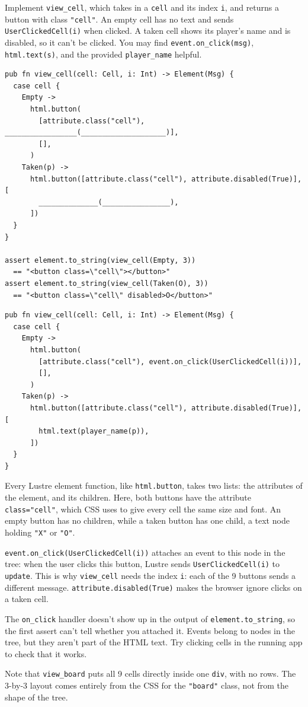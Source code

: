 \begin{blocksection}
\question Implement \texttt{view\_cell}, which takes in a \texttt{cell} and its index \texttt{i}, and returns a button with class \texttt{"cell"}. An empty cell has no text and sends \lstinline{UserClickedCell(i)} when clicked. A taken cell shows its player's name and is disabled, so it can't be clicked. You may find \lstinline{event.on_click(msg)}, \lstinline{html.text(s)}, and the provided \texttt{player\_name} helpful.
\begin{lstlisting}
pub fn view_cell(cell: Cell, i: Int) -> Element(Msg) {
  case cell {
    Empty ->
      html.button(
        [attribute.class("cell"), _________________(____________________)],
        [],
      )
    Taken(p) ->
      html.button([attribute.class("cell"), attribute.disabled(True)], [
        ______________(________________),
      ])
  }
}

assert element.to_string(view_cell(Empty, 3))
  == "<button class=\"cell\"></button>"
assert element.to_string(view_cell(Taken(O), 3))
  == "<button class=\"cell\" disabled>O</button>"
\end{lstlisting}

\begin{solution}
\begin{lstlisting}
pub fn view_cell(cell: Cell, i: Int) -> Element(Msg) {
  case cell {
    Empty ->
      html.button(
        [attribute.class("cell"), event.on_click(UserClickedCell(i))],
        [],
      )
    Taken(p) ->
      html.button([attribute.class("cell"), attribute.disabled(True)], [
        html.text(player_name(p)),
      ])
  }
}
\end{lstlisting}
\end{solution}

\begin{questionmeta}
  Every Lustre element function, like \lstinline{html.button}, takes two lists: the attributes of the element, and its children. Here, both buttons have the attribute \lstinline{class="cell"}, which CSS uses to give every cell the same size and font. An empty button has no children, while a taken button has one child, a text node holding \texttt{"X"} or \texttt{"O"}.

  \lstinline{event.on_click(UserClickedCell(i))} attaches an event to this node in the tree: when the user clicks this button, Lustre sends \lstinline{UserClickedCell(i)} to \texttt{update}. This is why \texttt{view\_cell} needs the index \texttt{i}: each of the 9 buttons sends a different message. \lstinline{attribute.disabled(True)} makes the browser ignore clicks on a taken cell.

  The \lstinline{on_click} handler doesn't show up in the output of \lstinline{element.to_string}, so the first assert can't tell whether you attached it. Events belong to nodes in the tree, but they aren't part of the HTML text. Try clicking cells in the running app to check that it works.

  Note that \texttt{view\_board} puts all 9 cells directly inside one \lstinline{div}, with no rows. The 3-by-3 layout comes entirely from the CSS for the \texttt{"board"} class, not from the shape of the tree.
\end{questionmeta}
\end{blocksection}
